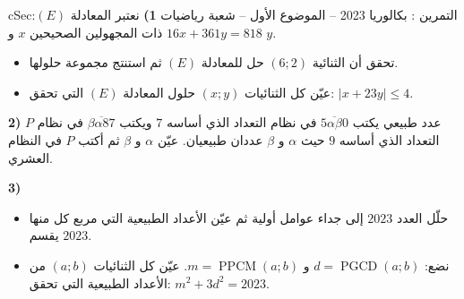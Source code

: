 \documentclass[12pt,a4paper]{article}
\newenvironment{BOX}[2]{\begin{otherlanguage}{english}\begin{arbox}{#1}{#2}}{\end{arbox}\end{otherlanguage}}
\newcounter{exo}
\newenvironment{tamrin}[1]{\stepcounter{exo}\begin{BOX}{cSec}{التمرين \theexo: #1}}{\end{BOX}}
\newcommand{\pgcd}{\operatorname{PGCD}}
\newcommand{\ppcm}{\operatorname{PPCM}}
\newenvironment{sq}{\begin{itemize}[leftmargin=2.4em,itemsep=3pt]}{\end{itemize}}
\newcommand{\qa}{\item[(أ)]}\newcommand{\qb}{\item[(ب)]}\newcommand{\qc}{\item[(جـ)]}\newcommand{\qd}{\item[(د)]}\newcommand{\qe}{\item[(هـ)]}
\begin{document}
\begin{tamrin}{بكالوريا 2023 -- الموضوع الأول -- شعبة رياضيات}
\textbf{1)} نعتبر المعادلة $(E)$:\quad $16x+361y=818$ ذات المجهولين الصحيحين $x$ و $y$.
\begin{sq}
\qa تحقق أن الثنائية $(6;2)$ حل للمعادلة $(E)$ ثم استنتج مجموعة حلولها.
\qb عيّن كل الثنائيات $(x;y)$ حلول المعادلة $(E)$ التي تحقق: $|x+23y|\le4$.
\end{sq}
\textbf{2)} $P$ عدد طبيعي يكتب $\overline{5\alpha\beta0}$ في نظام التعداد الذي أساسه $7$ ويكتب $\overline{\beta\alpha87}$ في نظام التعداد الذي أساسه $9$ حيث $\alpha$ و $\beta$ عددان طبيعيان.
عيّن $\alpha$ و $\beta$ ثم أكتب $P$ في النظام العشري.

\textbf{3)}
\begin{sq}
\qa حلّل العدد $2023$ إلى جداء عوامل أولية ثم عيّن الأعداد الطبيعية التي مربع كل منها يقسم $2023$.
\qb نضع: $d=\pgcd(a;b)$ و $m=\ppcm(a;b)$.
عيّن كل الثنائيات $(a;b)$ من الأعداد الطبيعية التي تحقق: $m^2+3d^2=2023$.
\end{sq}
\end{tamrin}
\end{document}
